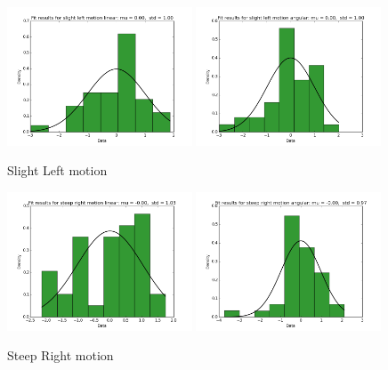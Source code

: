 \documentclass[10pt]{scrartcl}
\begin{document}
\begin{figure}[H]
\centering
\caption{Slight Left motion}
\label{fig:13}
\includegraphics[width=0.49\textwidth ]{images/pca_slight_left_linear_data}
\includegraphics[width=0.49\textwidth]{images/pca_slight_left_angular_data}
\end{figure}

\begin{figure}[H]
\centering
\caption{Steep Right motion}
\label{fig:14}
\includegraphics[width=0.49\textwidth ]{images/pca_steep_right_linear_data}
\includegraphics[width=0.49\textwidth]{images/pca_steep_right_angular_data}
\end{figure}
\end{document}
